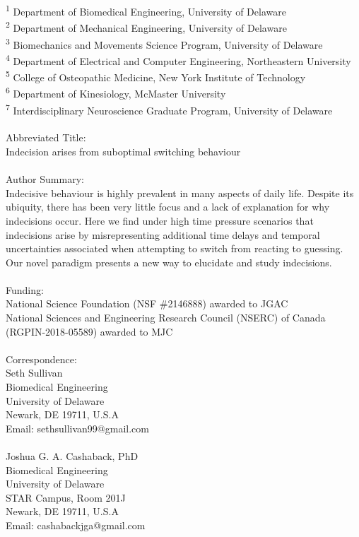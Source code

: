 \documentclass[12pt]{article}
\begin{document}
\noindent \textsuperscript{1} Department of Biomedical Engineering, University of Delaware\\
\textsuperscript{2} Department of Mechanical Engineering, University of Delaware\\
\textsuperscript{3} Biomechanics and Movements Science Program, University of Delaware\\
\textsuperscript{4} Department of Electrical and Computer Engineering, Northeastern University\\
\textsuperscript{5} College of Osteopathic Medicine, New York Institute of Technology\\
\textsuperscript{6} Department of Kinesiology, McMaster University\\
\textsuperscript{7} Interdisciplinary Neuroscience Graduate Program, University of Delaware\\
\vspace{1mm}
\\
\textcolor{mydarkblue}{\large Abbreviated Title:}
\vspace{1mm}
\\
Indecision arises from suboptimal switching behaviour
\\
\vspace{1mm}
\\
\textcolor{mydarkblue}{\large Author Summary:}
\vspace{1mm}
\\
Indecisive behaviour is highly prevalent in many aspects of daily life. Despite its ubiquity, there has been very little focus and a lack of explanation for why indecisions occur. Here we find under high time pressure scenarios that indecisions arise by misrepresenting additional time delays and temporal uncertainties associated when attempting to switch from reacting to guessing. Our novel paradigm presents a new way to elucidate and study indecisions.
\\
\\
\textcolor{mydarkblue}{\large Funding:}
\vspace{1mm}
\\
National Science Foundation (NSF \#2146888) awarded to JGAC
\\
National Sciences and Engineering Research Council (NSERC) of Canada (RGPIN-2018-05589) awarded to MJC
\\
\vspace{1mm}
\\
\textcolor{mydarkblue}{\large Correspondence:}
\\
Seth Sullivan\\
Biomedical Engineering\\
University of Delaware\\
Newark, DE 19711, U.S.A\\
Email: sethsullivan99@gmail.com
\\
\\
Joshua G. A. Cashaback, PhD\\
Biomedical Engineering\\
University of Delaware\\
STAR Campus, Room 201J\\
Newark, DE 19711, U.S.A\\
Email: cashabackjga@gmail.com
\end{document}

